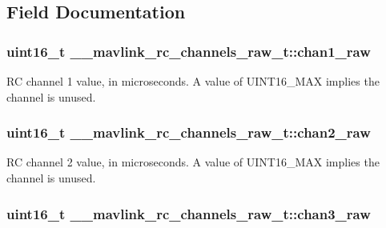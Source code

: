 \subsection{Field Documentation}
\hypertarget{struct____mavlink__rc__channels__raw__t_a61bd698c061cfaa1da0b02d3ee390f4e}{
\subsubsection[{chan1\+\_\+raw}]{\setlength{\rightskip}{0pt plus 5cm}uint16\+\_\+t \+\_\+\+\_\+mavlink\+\_\+rc\+\_\+channels\+\_\+raw\+\_\+t\+::chan1\+\_\+raw}}\label{struct____mavlink__rc__channels__raw__t_a61bd698c061cfaa1da0b02d3ee390f4e}


R\+C channel 1 value, in microseconds. A value of U\+I\+N\+T16\+\_\+\+M\+A\+X implies the channel is unused. 

\hypertarget{struct____mavlink__rc__channels__raw__t_a87484f764dc99860781a6a29a07f9a7a}{
\subsubsection[{chan2\+\_\+raw}]{\setlength{\rightskip}{0pt plus 5cm}uint16\+\_\+t \+\_\+\+\_\+mavlink\+\_\+rc\+\_\+channels\+\_\+raw\+\_\+t\+::chan2\+\_\+raw}}\label{struct____mavlink__rc__channels__raw__t_a87484f764dc99860781a6a29a07f9a7a}


R\+C channel 2 value, in microseconds. A value of U\+I\+N\+T16\+\_\+\+M\+A\+X implies the channel is unused. 

\hypertarget{struct____mavlink__rc__channels__raw__t_af56e588a0dcc66fbf2fdb61b5995060c}{
\subsubsection[{chan3\+\_\+raw}]{\setlength{\rightskip}{0pt plus 5cm}uint16\+\_\+t \+\_\+\+\_\+mavlink\+\_\+rc\+\_\+channels\+\_\+raw\+\_\+t\+::chan3\+\_\+raw}}\label{struct____mavlink__rc__channels__raw__t_af56e588a0dcc66fbf2fdb61b5995060c}


